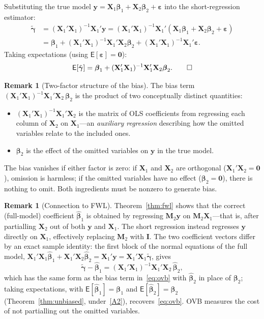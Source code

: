 \documentclass[12pt,a4paper]{article}
\makeatletter
\theoremstyle{definition}
\newtheorem{remark}[theorem]{Remark}
\renewenvironment{proof}[1][\proofname]{\par
  \pushQED{\qed}%
  \normalfont \topsep6\p@\@plus6\p@\relax
  \trivlist
  \item[\hskip\labelsep\bfseries #1\@addpunct{.}]\ignorespaces
}{%
  \popQED\endtrivlist\@endpefalse
}
\newcommand\expc{\mathsf{E}}
\newcommand{\bX}{\mathbf{X}}
\newcommand{\by}{\mathbf{y}}
\def\bb{\boldsymbol{\beta}}
\newcommand{\be}{\boldsymbol{\varepsilon}}
\newcommand{\bI}{\mathbf{I}}
\newcommand{\bM}{\mathbf{M}}
\newcommand{\bzero}{\mathbf{0}}
\makeatother
\begin{document}
\begin{proof}
Substituting the true model $\by = \bX_1\bb_1 + \bX_2\bb_2 + \be$ into the short-regression estimator:
\begin{align*}
\tilde{\boldsymbol\gamma} &= (\bX_1'\bX_1)^{-1}\bX_1'\by = (\bX_1'\bX_1)^{-1}\bX_1'(\bX_1\bb_1 + \bX_2\bb_2 + \be)\\
&= \bb_1 + (\bX_1'\bX_1)^{-1}\bX_1'\bX_2\bb_2 + (\bX_1'\bX_1)^{-1}\bX_1'\be.
\end{align*}
Taking expectations (using $\expc[\be] = \bzero$):
\[
\expc[\tilde{\boldsymbol\gamma}] = \bb_1 + (\bX_1'\bX_1)^{-1}\bX_1'\bX_2\bb_2. \qedhere
\]
\end{proof}

\begin{remark}[Two-factor structure of the bias]\label{rem:ovb-structure}
The bias term $(\bX_1'\bX_1)^{-1}\bX_1'\bX_2\,\bb_2$ is the product of two conceptually distinct quantities:
\begin{itemize}
\item $(\bX_1'\bX_1)^{-1}\bX_1'\bX_2$ is the matrix of OLS coefficients from regressing each column of $\bX_2$ on $\bX_1$---an \emph{auxiliary regression} describing how the omitted variables relate to the included ones.
\item $\bb_2$ is the effect of the omitted variables on $\by$ in the true model.
\end{itemize}
The bias vanishes if either factor is zero: if $\bX_1$ and $\bX_2$ are orthogonal ($\bX_1'\bX_2 = \bzero$), omission is harmless; if the omitted variables have no effect ($\bb_2 = \bzero$), there is nothing to omit. Both ingredients must be nonzero to generate bias.
\end{remark}

\begin{remark}[Connection to FWL]\label{rem:ovb-fwl}
Theorem~\ref{thm:fwl} shows that the correct (full-model) coefficient $\hat{\bb}_1$ is obtained by regressing $\bM_2\by$ on $\bM_2\bX_1$---that is, after partialling $\bX_2$ out of both $\by$ and $\bX_1$. The short regression instead regresses $\by$ directly on $\bX_1$, effectively replacing $\bM_2$ with $\bI$. The two coefficient vectors differ by an exact sample identity: the first block of the normal equations of the full model, $\bX_1'\bX_1\hat{\bb}_1 + \bX_1'\bX_2\hat{\bb}_2 = \bX_1'\by = \bX_1'\bX_1\tilde{\boldsymbol\gamma}$, gives
\[
\tilde{\boldsymbol\gamma} - \hat{\bb}_1 = (\bX_1'\bX_1)^{-1}\bX_1'\bX_2\,\hat{\bb}_2,
\]
which has the same form as the bias term in~\eqref{eq:ovb} with $\hat{\bb}_2$ in place of $\bb_2$; taking expectations, with $\expc[\hat{\bb}_1] = \bb_1$ and $\expc[\hat{\bb}_2] = \bb_2$ (Theorem~\ref{thm:unbiased}, under~\ref{A2}), recovers~\eqref{eq:ovb}. OVB measures the cost of not partialling out the omitted variables.
\end{remark}
\end{document}
